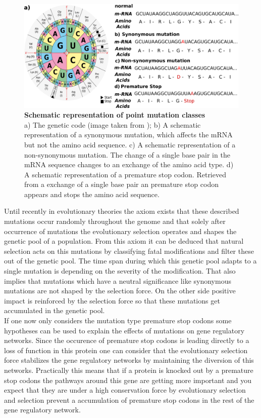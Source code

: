 \begin{figure}[tb]
    \centering
    \begin{minipage}[h]{0.9\textwidth}
      \centering
      \includegraphics[width=1\textwidth]{images/Mutations.png}
      \caption{\textbf{Schematic representation of point mutation classes}\\
      a) The genetic code (image taken from \textcite{bresch2013}); b) A schematic representation of a synonymous mutation, which affects the mRNA but not the amino acid sequence. c) A schematic representation of a non-synonymous mutation. The change of a single base pair in the mRNA sequence changes to an exchange of the amino acid type. d) A schematic representation of a premature stop codon. Retrieved from a exchange of a single base pair an premature stop codon appears and stops the amino acid sequence.}
     \label{fig:Codons}
    \end{minipage}
  \end{figure}
Until recently in evolutionary theories the axiom exists that these described mutations occur randomly throughout the genome and that solely after occurrence of mutations the evolutionary selection operates and shapes the genetic pool of a population\cite{futuyma1986}. From this axiom it can be deduced that natural selection acts on this mutations by classifying fatal modifications and filter these out of the genetic pool. The time span during which this genetic pool adapts to a single mutation is depending on the severity of the modification. That also implies that mutations which have a neutral significance like synonymous mutations are not shaped by the selection force. On the other side positive impact is reinforced by the selection force so that these mutations get accumulated in the genetic pool\cite{darwin1909}.\\
If one now only considers the mutation type premature stop codons some hypotheses can be used to explain the effects of mutations on gene regulatory networks. Since the occurence of premature stop codons is leading directly to a loss of function in this protein one can consider that the evolutionary selection force stabilizes the gene regulatory networks by maintaining the diversion of this networks. Practically this means that if a protein is knocked out by a premature stop codons the pathways around this gene are getting more important and you expect that they are under a high conservation force by evolutionary selection and selection prevent a accumulation of premature stop codons in the rest of the gene regulatory network.\\
